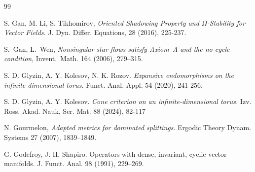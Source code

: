 \documentclass[12pt]{article}
\theoremstyle{definition}
\begin{document}
\begin{thebibliography}{99}
{
S. Gan, M. Li, S. Tikhomirov,
\textit{Oriented Shadowing Property and $\Omega$-Stability for Vector Fields.}
J. Dyn. Differ. Equations, 28 (2016), 225-237.

S.~Gan, L.~Wen, \emph{Nonsingular star flows satisfy Axiom~A and the no-cycle condition}, Invent.~Math. 164 (2006), 279--315. 

S. D. Glyzin, A. Y. Kolesov, N. K. Rozov.
\textit{Expansive endomorphisms on the infinite-dimensional torus.}
Funct. Anal. Appl. 54 (2020), 241-256.








S. D. Glyzin, A. Y. Kolesov.
\textit{Cone criterion on an infinite-dimensional torus.}
Izv. Ross. Akad. Nauk, Ser. Mat. 88 (2024), 82-117


N. Gourmelon, \textit{Adapted metrics for dominated splittings}. Ergodic Theory Dynam. Systems 27 (2007), 1839–1849.

G. Godefroy, J. H. Shapiro. Operators with dense, invariant, cyclic vector manifolds. J. Funct. Anal.
98 (1991), 229–269.


}
\end{thebibliography}
\end{document}
